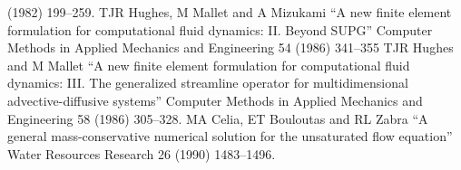\documentclass[]{scrreprt}
\begin{document}
\begin{thebibliography}{99}
  (1982) 199--259.
TJR Hughes, M Mallet and A Mizukami ``A new finite element
  formulation for computational fluid dynamics: II. Beyond SUPG''
  Computer Methods in Applied Mechanics and Engineering 54 (1986) 341--355
TJR Hughes and M Mallet ``A new finite element
  formulation for computational fluid dynamics: III. The generalized
  streamline operator for multidimensional advective-diffusive
  systems''  Computer Methods in Applied Mechanics and Engineering 58
  (1986) 305--328.
MA Celia, ET Bouloutas and RL Zabra ``A general
  mass-conservative numerical solution for the unsaturated flow
  equation''  Water Resources Research 26 (1990) 1483--1496.
\end{thebibliography}
\end{document}
